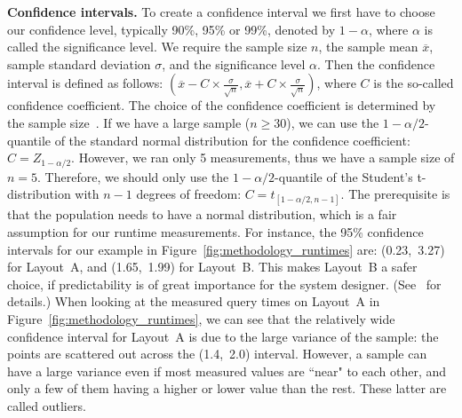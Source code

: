 \documentclass{sig-alternate}
\begin{document}
\noindent\textbf{Confidence intervals.}
To create a confidence interval we first have to choose our confidence level, typically 90\%, 95\% or 99\%, denoted by $1 - \alpha$, where $\alpha$ is called the significance level. 
We require the sample size $n$, the sample mean $\overline{x} $, sample standard deviation $\sigma$, and the significance level $\alpha$. Then the confidence interval is defined as follows: $( \overline{x} - C \times \frac{\sigma}{\sqrt{n}} , \overline{x} + C \times \frac{\sigma}{\sqrt{n}}) $, where $C$ is the so-called confidence coefficient.
The choice of the confidence coefficient is determined by the sample size~\cite{jain1991art}. If we have a large sample ($n \geq 30$), we can use the $1 - \alpha / 2$-quantile of the standard normal distribution for the confidence coefficient: $C = Z_{1-\alpha / 2}$. However, we ran only 5 measurements, thus we have a sample size of $n=5$. Therefore, we should only use the $1 - \alpha / 2$-quantile of the Student's t-distribution with $n-1$ degrees of freedom: $C = t_{[1-\alpha / 2 , n-1]}$. The prerequisite is that the population needs to have a normal distribution, which is a fair assumption for our runtime measurements.
For instance, the 95\% confidence intervals for our example in Figure~\ref{fig:methodology_runtimes} are:  (0.23,~3.27) for Layout~A, and (1.65,~1.99) for Layout~B. This makes Layout~B a safer choice, if predictability is of great importance for the system designer. (See~\cite{jain1991art} for details.)
When looking at the measured query times on Layout~A in Figure~\ref{fig:methodology_runtimes}, we can see that the relatively wide confidence interval for Layout~A is due to the large variance of the sample: the points are scattered  out across the (1.4,~2.0) interval. However, a sample can have a large variance even if most measured values are ``near" to each other, and only a few of them having a higher or lower value than the rest. These latter are called outliers. 
\end{document}
